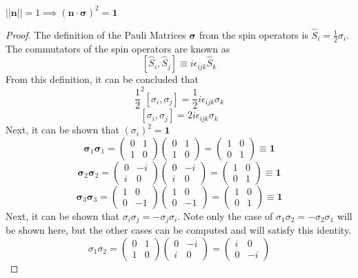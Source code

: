 \begin{sol}
\begin{lemma}
$||\mathbf{n}||=1\implies(\mathbf{n}\cdot\mathbf{\sigma})^2=\mathbf{1}
$
\end{lemma}
\begin{proof} 
The definition of the Pauli Matrices $\mathbf{\sigma}$ from the spin operators is $\hat{S}_i=\frac{1}{2}\sigma_i$. The commutators of the spin operators are known as
$$[\hat{S}_i,\hat{S}_j]\equiv i\epsilon_{ijk}\hat{S}_k$$ 
From this definition, it can be concluded that
$$\frac{1}{2}^2[\sigma_i,\sigma_j]=\frac{1}{2}i\epsilon_{ijk}\sigma_k$$
$$[\sigma_i,\sigma_j]=2i\epsilon_{ijk}\sigma_k$$
Next, it can be shown that $(\sigma_i)^2=\mathbf{1}$ 
$$\mathbf{\sigma}_1\mathbf{\sigma}_1=\begin{pmatrix}0&1\\1&0\end{pmatrix}\begin{pmatrix}0&1\\1&0\end{pmatrix} =\begin{pmatrix}1 &0\\0&1\end{pmatrix}\equiv\mathbf{1}$$ $$\mathbf{\sigma}_2\mathbf{\sigma}_2=\begin{pmatrix}0&-i\\i&0\end{pmatrix}\begin{pmatrix}0&-i\\i&0\end{pmatrix} =\begin{pmatrix}1 &0\\0&1\end{pmatrix}\equiv\mathbf{1}$$ $$\mathbf{\sigma}_3\mathbf{\sigma}_3=\begin{pmatrix}1&0\\0&-1\end{pmatrix}\begin{pmatrix}1&0\\0&-1\end{pmatrix} =\begin{pmatrix}1 &0\\0&1\end{pmatrix}\equiv\mathbf{1}$$
Next, it can be shown that $\sigma_i\sigma_j=-\sigma_j\sigma_i$. Note only the case of $\sigma_1\sigma_2=-\sigma_2\sigma_1$ will be shown here, but the other cases can be computed and will satisfy this identity.
$$\sigma_1\sigma_2=\begin{pmatrix}0&1\\1&0\end{pmatrix}\begin{pmatrix}0&-i\\i&0\end{pmatrix}=\begin{pmatrix}i&0\\0&-i\end{pmatrix}$$ 

\end{proof}
\end{sol}
